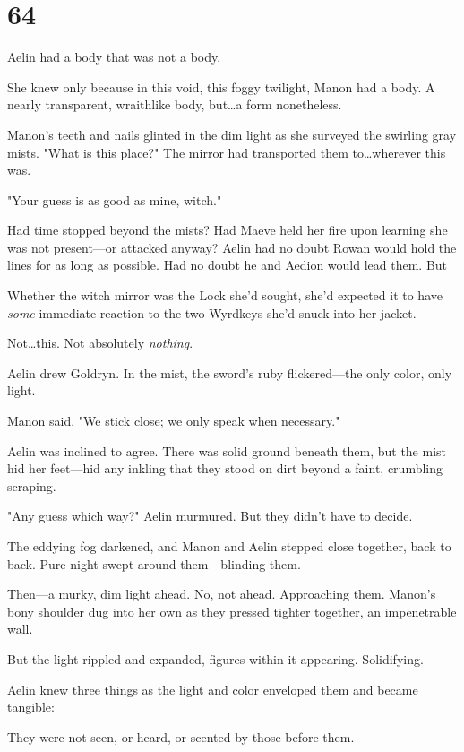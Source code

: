 
\chapter{64}

Aelin had a body that was not a body.

She knew only because in this void, this foggy twilight, Manon had a body.
A nearly transparent, wraithlike body, but\ldots a form nonetheless.

Manon's teeth and nails glinted in the dim light as she surveyed the swirling gray mists.
"What is this place?"
The mirror had transported them to\ldots wherever this was.

"Your guess is as good as mine, witch."

Had time stopped beyond the mists?
Had Maeve held her fire upon learning she was not present---or attacked anyway?
Aelin had no doubt Rowan would hold the lines for as long as possible.
Had no doubt he and Aedion would lead them.
But 

Whether the witch mirror was the Lock she'd sought, she'd expected it to have \emph{some} immediate reaction to the two Wyrdkeys she'd snuck into her jacket.

Not\ldots this.
Not absolutely \emph{nothing}.

Aelin drew Goldryn.
In the mist, the sword's ruby flickered---the only color, only light.

Manon said, "We stick close; we only speak when necessary."

Aelin was inclined to agree.
There was solid ground beneath them, but the mist hid her feet---hid any inkling that they stood on dirt beyond a faint, crumbling scraping.

"Any guess which way?"
Aelin murmured.
But they didn't have to decide.

The eddying fog darkened, and Manon and Aelin stepped close together, back to back.
Pure night swept around them---blinding them.

Then---a murky, dim light ahead.
No, not ahead.
Approaching them.
Manon's bony shoulder dug into her own as they pressed tighter together, an impenetrable wall.

But the light rippled and expanded, figures within it appearing.
Solidifying.

Aelin knew three things as the light and color enveloped them and became tangible:

They were not seen, or heard, or scented by those before them.

